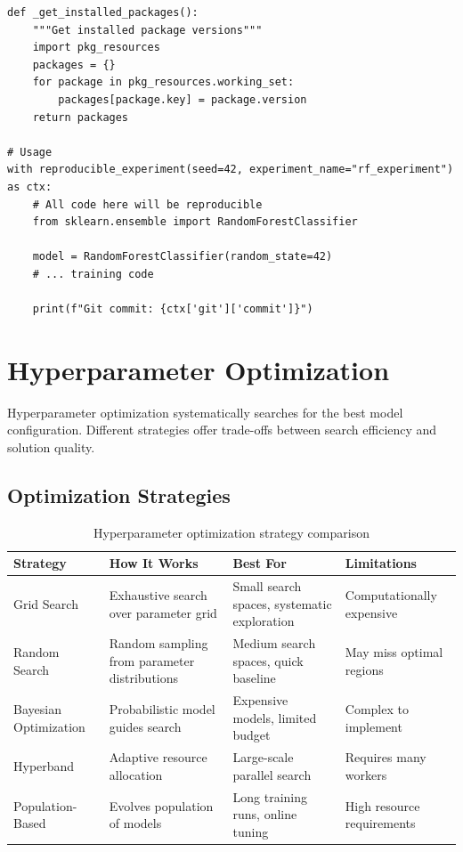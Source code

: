 \begin{lstlisting}[style=python, caption=Reproducibility context manager]
def _get_installed_packages():
    """Get installed package versions"""
    import pkg_resources
    packages = {}
    for package in pkg_resources.working_set:
        packages[package.key] = package.version
    return packages

# Usage
with reproducible_experiment(seed=42, experiment_name="rf_experiment") as ctx:
    # All code here will be reproducible
    from sklearn.ensemble import RandomForestClassifier

    model = RandomForestClassifier(random_state=42)
    # ... training code

    print(f"Git commit: {ctx['git']['commit']}")
\end{lstlisting}

\section{Hyperparameter Optimization}

Hyperparameter optimization systematically searches for the best model configuration. Different strategies offer trade-offs between search efficiency and solution quality.

\subsection{Optimization Strategies}

\begin{table}[h]
\centering
\begin{tabular}{|l|p{3.3cm}|p{3.3cm}|p{3.3cm}|}
\hline
\textbf{Strategy} & \textbf{How It Works} & \textbf{Best For} & \textbf{Limitations} \\
\hline
Grid Search & Exhaustive search over parameter grid & Small search spaces, systematic exploration & Computationally expensive \\
\hline
Random Search & Random sampling from parameter distributions & Medium search spaces, quick baseline & May miss optimal regions \\
\hline
Bayesian Optimization & Probabilistic model guides search & Expensive models, limited budget & Complex to implement \\
\hline
Hyperband & Adaptive resource allocation & Large-scale parallel search & Requires many workers \\
\hline
Population-Based & Evolves population of models & Long training runs, online tuning & High resource requirements \\
\hline
\end{tabular}
\caption{Hyperparameter optimization strategy comparison}
\label{tab:hpo_strategies}
\end{table}


